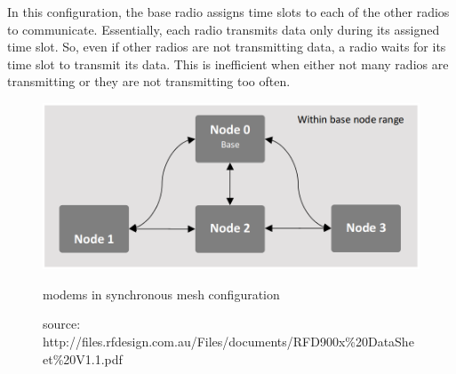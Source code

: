 In this configuration, the base radio assigns time slots to each of the other radios to communicate. Essentially, each radio transmits data only during its assigned time slot. So, even if other radios are not transmitting data, a radio waits for its time slot to transmit its data. This is inefficient when either not many radios are transmitting or they are not transmitting too often.

\begin{figure}[h]
	\centering
	\includegraphics[scale=0.4]{Pictures/sync.png}
	\caption{modems in synchronous mesh configuration}
	\label{fig: rfdsync}
	\caption*{source: http://files.rfdesign.com.au/Files/documents/RFD900x\%20DataSheet\%20V1.1.pdf}
\end{figure}




